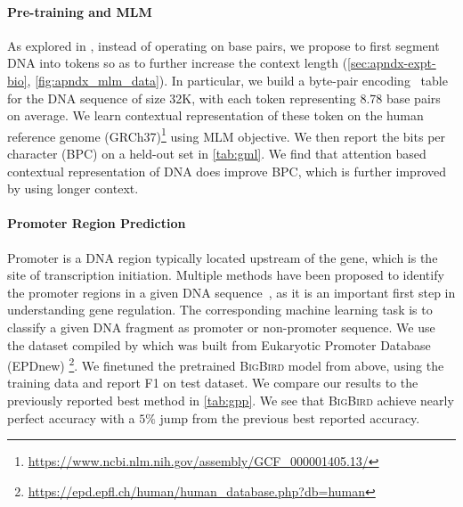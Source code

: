 \paragraph{Pre-training and MLM} As explored in \citet{liang2012segmenting}, instead of operating on base pairs, we propose to first segment DNA into tokens so as to further increase the context length (\ref{sec:apndx-expt-bio}, \ref{fig:apndx_mlm_data}).
In particular, we build a byte-pair encoding~\citep{kudo2018sentencepiece} table for the DNA sequence of size 32K, with each token representing 8.78 base pairs on average. We learn contextual representation of these token on the human reference genome (GRCh37)\footnote{\url{https://www.ncbi.nlm.nih.gov/assembly/GCF_000001405.13/}} using MLM objective. We then report the bits per character (BPC) on a held-out set in \ref{tab:gml}. 
We find that attention based contextual representation of DNA does improve BPC, which is further improved by using longer context.

\paragraph{Promoter Region Prediction} Promoter is a DNA region typically located upstream of the gene, which is the site of transcription initiation. Multiple methods have been proposed to identify the promoter regions in a given DNA sequence~\citep{yang2017exploiting, lin2017identifying, bharanikumar2018promoterpredict, xiao2019ipsw, oubounyt2019deepromoter}, as it is an important first step in understanding gene regulation. The corresponding machine learning task is to classify a given DNA fragment as promoter or non-promoter sequence. We use the dataset compiled by \citet{oubounyt2019deepromoter} which was built from Eukaryotic Promoter Database (EPDnew) \citep{dreos2013epd} 
\footnote{ \url{https://epd.epfl.ch/human/human_database.php?db=human}}. 
We finetuned the pretrained \textsc{BigBird} model from above, using the training data and report F1 on test dataset. We compare our results to the previously reported best method in \ref{tab:gpp}.
We see that  
\textsc{BigBird} achieve nearly perfect accuracy with a $5\%$ jump from the previous best reported accuracy.

